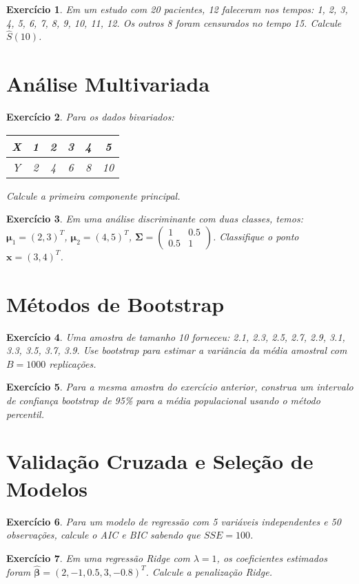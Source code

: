 \documentclass[12pt,a4paper]{article}
\newtheorem{exercise}{Exercício}
\begin{document}
\begin{exercise}
Em um estudo com 20 pacientes, 12 faleceram nos tempos: 1, 2, 3, 4, 5, 6, 7, 8, 9, 10, 11, 12. Os outros 8 foram censurados no tempo 15. Calcule $\hat{S}(10)$.
\end{exercise}

\section{Análise Multivariada}

\begin{exercise}
Para os dados bivariados:
\begin{center}
\begin{tabular}{|c|c|c|c|c|c|}
\hline
X & 1 & 2 & 3 & 4 & 5 \\
\hline
Y & 2 & 4 & 6 & 8 & 10 \\
\hline
\end{tabular}
\end{center}
Calcule a primeira componente principal.
\end{exercise}

\begin{exercise}
Em uma análise discriminante com duas classes, temos:
$\boldsymbol{\mu}_1 = (2, 3)^T$, $\boldsymbol{\mu}_2 = (4, 5)^T$, $\boldsymbol{\Sigma} = \begin{pmatrix} 1 & 0.5 \\ 0.5 & 1 \end{pmatrix}$.
Classifique o ponto $\mathbf{x} = (3, 4)^T$.
\end{exercise}

\section{Métodos de Bootstrap}

\begin{exercise}
Uma amostra de tamanho 10 forneceu: 2.1, 2.3, 2.5, 2.7, 2.9, 3.1, 3.3, 3.5, 3.7, 3.9. Use bootstrap para estimar a variância da média amostral com $B = 1000$ replicações.
\end{exercise}

\begin{exercise}
Para a mesma amostra do exercício anterior, construa um intervalo de confiança bootstrap de 95\% para a média populacional usando o método percentil.
\end{exercise}

\section{Validação Cruzada e Seleção de Modelos}

\begin{exercise}
Para um modelo de regressão com 5 variáveis independentes e 50 observações, calcule o AIC e BIC sabendo que $SSE = 100$.
\end{exercise}

\begin{exercise}
Em uma regressão Ridge com $\lambda = 1$, os coeficientes estimados foram $\hat{\boldsymbol{\beta}} = (2, -1, 0.5, 3, -0.8)^T$. Calcule a penalização Ridge.
\end{exercise}
\end{document}

